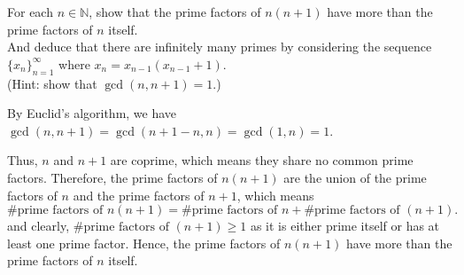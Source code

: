 \documentclass{elegantbook}
\begin{document}
\begin{problemset}[Exercises]
  \item For each $n \in \mathbb{N}$, show that the prime factors of $n(n+1)$ have more than the prime factors of $n$ itself. \\
  And deduce that there are infinitely many primes by considering the sequence $\{x_n\}_{n=1}^{\infty}$ where $x_{n}=x_{n-1}(x_{n-1}+1)$. \\
  (Hint: show that $\gcd(n, n+1) = 1$.)
  \begin{solution}
    By Euclid's algorithm, we have $\gcd(n, n+1) = \gcd(n+1 - n, n) = \gcd(1, n) = 1$. 

    Thus, $n$ and $n+1$ are coprime, which means they share no common prime factors. Therefore, the prime factors of $n(n+1)$ are the union of the prime factors of $n$ and the prime factors of $n+1$, which means
    \[
      \# \text{prime factors of } n(n+1) = \# \text{prime factors of } n + \# \text{prime factors of } (n+1).
    \]
    and clearly, $\# \text{prime factors of } (n+1) \geq 1$ as it is either prime itself or has at least one prime factor. Hence, the prime factors of $n(n+1)$ have more than the prime factors of $n$ itself.


\end{solution}
\end{problemset}
\end{document}
